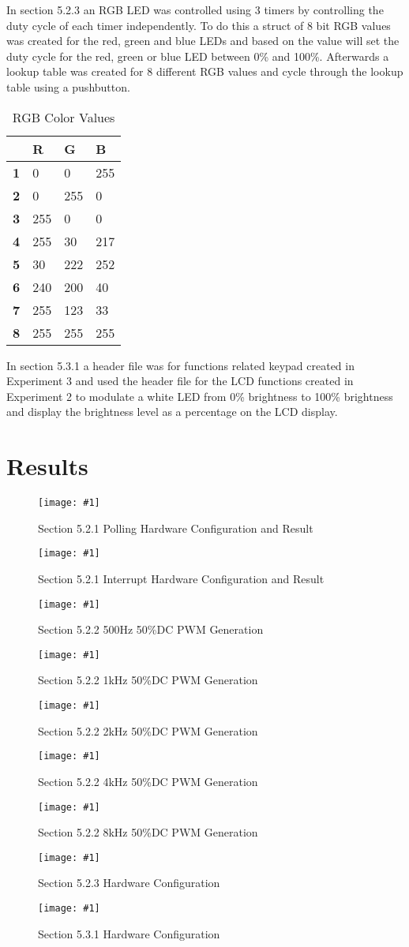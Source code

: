 \documentclass[journal]{IEEEtran}
\newcommand\createfigure[2]{
  \begin{figure}[H]
    \centering \texttt{[image: \#1]}
    \caption{#2}
  \end{figure}}
\begin{document}
In section 5.2.3 an RGB LED was controlled using 3 timers by controlling the duty cycle of each timer independently. To do this a struct of 8 bit RGB values was created for the red, green and blue LEDs and based on the value will set the duty cycle for the red, green or blue LED between 0\% and 100\%. Afterwards a lookup table was created for 8 different RGB values and cycle through the lookup table using a pushbutton.
\begin{table}[H]
  \begin{center}
  \begin{tabularx}{0.4\textwidth}{|X|X|X|X|}
    \hline
    \rowcolor{gray}
     & R & G & B \\
    \hline
    \textbf{1} & 0 & 0 & 255\\
    \hline
    \textbf{2} & 0 & 255 & 0\\
    \hline
    \textbf{3} & 255 & 0 & 0\\
    \hline
    \textbf{4} & 255 & 30 & 217\\
    \hline
    \textbf{5} & 30 & 222 & 252\\
    \hline
    \textbf{6} & 240 & 200 & 40\\
    \hline
    \textbf{7} & 255 & 123 & 33\\
    \hline
    \textbf{8} & 255 & 255 & 255\\
    \hline
  \end{tabularx}
  \caption{RGB Color Values}
  \end{center}
\end{table}
In section 5.3.1 a header file was for functions related keypad created in Experiment 3 and used the header file for the LCD functions created in Experiment 2 to modulate a white LED from 0\% brightness to 100\% brightness and display the brightness level as a percentage on the LCD display.
\section{Results}
\createfigure{./Figures/5.2.1-Polling.jpg}{Section 5.2.1 Polling Hardware Configuration and Result}
\createfigure{./Figures/5.2.1-Interrupt.jpg}{Section 5.2.1 Interrupt Hardware Configuration and Result}
\createfigure{./Figures/5.2.2-500Hz.jpg}{Section 5.2.2 500\si{Hz} 50\%DC PWM Generation}
\createfigure{./Figures/5.2.2-1kHz.jpg}{Section 5.2.2 1\si{kHz} 50\%DC PWM Generation}
\createfigure{./Figures/5.2.2-2kHz.jpg}{Section 5.2.2 2\si{kHz} 50\%DC PWM Generation}
\createfigure{./Figures/5.2.2-4kHz.jpg}{Section 5.2.2 4\si{kHz} 50\%DC PWM Generation}
\createfigure{./Figures/5.2.2-8kHz.jpg}{Section 5.2.2 8\si{kHz} 50\%DC PWM Generation}
\createfigure{./Figures/5.2.3-Setup.jpg}{Section 5.2.3 Hardware Configuration}
\createfigure{./Figures/5.3.1-Setup.jpg}{Section 5.3.1 Hardware Configuration}
\nocite{rojasEmbeddedSystemsDesign2016}
\nocite{LCDControllerDatasheets}


\end{document}
